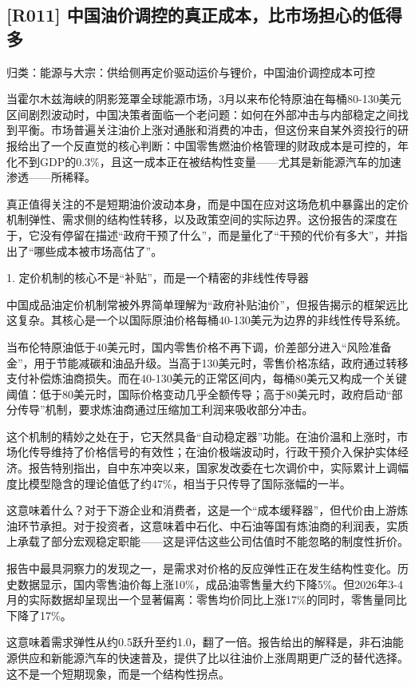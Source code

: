 \documentclass[11pt]{ctexart}
\begin{document}
\subsection{[R011] 中国油价调控的真正成本，比市场担心的低得多}
{\small\color{refgray}归类：能源与大宗：供给侧再定价驱动运价与锂价，中国油价调控成本可控}

当霍尔木兹海峡的阴影笼罩全球能源市场，3月以来布伦特原油在每桶80-130美元区间剧烈波动时，中国决策者面临一个老问题：如何在外部冲击与内部稳定之间找到平衡。市场普遍关注油价上涨对通胀和消费的冲击，但这份来自某外资投行的研报给出了一个反直觉的核心判断：中国零售燃油价格管理的财政成本是可控的，年化不到GDP的0.3\%，且这一成本正在被结构性变量——尤其是新能源汽车的加速渗透——所稀释。

真正值得关注的不是短期油价波动本身，而是中国在应对这场危机中暴露出的定价机制弹性、需求侧的结构性转移，以及政策空间的实际边界。这份报告的深度在于，它没有停留在描述“政府干预了什么”，而是量化了“干预的代价有多大”，并指出了“哪些成本被市场高估了”。

1. 定价机制的核心不是“补贴”，而是一个精密的非线性传导器

中国成品油定价机制常被外界简单理解为“政府补贴油价”，但报告揭示的框架远比这复杂。其核心是一个以国际原油价格每桶40-130美元为边界的非线性传导系统。

当布伦特原油低于40美元时，国内零售价格不再下调，价差部分进入“风险准备金”，用于节能减碳和油品升级。当高于130美元时，零售价格冻结，政府通过转移支付补偿炼油商损失。而在40-130美元的正常区间内，每桶80美元又构成一个关键阈值：低于80美元时，国际价格变动几乎全额传导；高于80美元时，政府启动“部分传导”机制，要求炼油商通过压缩加工利润来吸收部分冲击。

这个机制的精妙之处在于，它天然具备“自动稳定器”功能。在油价温和上涨时，市场化传导维持了价格信号的有效性；在油价极端波动时，行政干预介入保护实体经济。报告特别指出，自中东冲突以来，国家发改委在七次调价中，实际累计上调幅度比模型隐含的理论值低了约47\%，相当于只传导了国际涨幅的一半。

这意味着什么？对于下游企业和消费者，这是一个“成本缓释器”，但代价由上游炼油环节承担。对于投资者，这意味着中石化、中石油等国有炼油商的利润表，实质上承载了部分宏观稳定职能——这是评估这些公司估值时不能忽略的制度性折价。

报告中最具洞察力的发现之一，是需求对价格的反应弹性正在发生结构性变化。历史数据显示，国内零售油价每上涨10\%，成品油零售量大约下降5\%。但2026年3-4月的实际数据却呈现出一个显著偏离：零售均价同比上涨17\%的同时，零售量同比下降了17\%。

这意味着需求弹性从约0.5跃升至约1.0，翻了一倍。报告给出的解释是，非石油能源供应和新能源汽车的快速普及，提供了比以往油价上涨周期更广泛的替代选择。这不是一个短期现象，而是一个结构性拐点。
\end{document}
